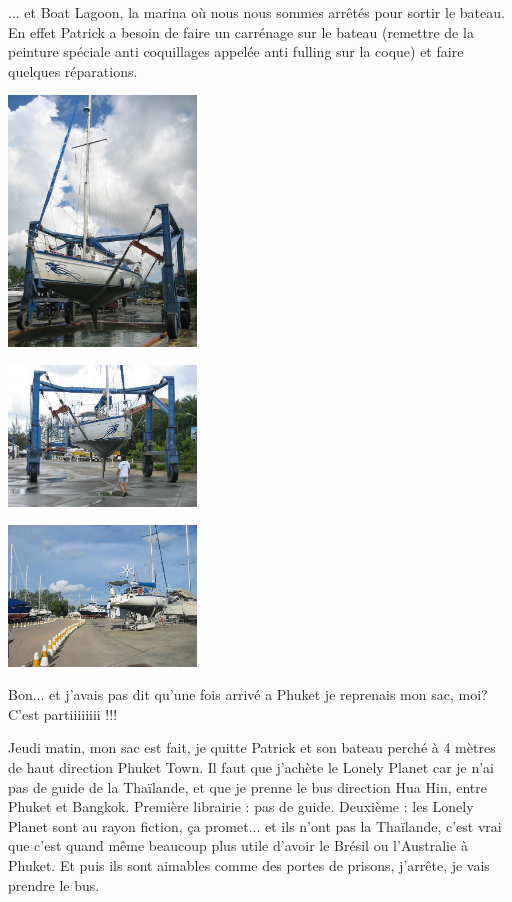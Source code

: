 \begin{multicols}{2}
... et Boat Lagoon, la marina où nous nous sommes arrêtés pour sortir le bateau. En effet Patrick a besoin de faire un carrénage sur le bateau (remettre de la peinture spéciale anti coquillages appelée anti fulling sur la coque) et faire quelques réparations.

\smallbreak
\hspace*{-0.65cm}
\includegraphics[width=5cm]{articles/Phucket/1212162371CgQw.jpg}
\smallbreak

\smallbreak
\hspace*{-0.65cm}
\includegraphics[width=5cm]{articles/Phucket/1212162371bVDs.jpg}
\smallbreak

\smallbreak
\hspace*{-0.65cm}
\includegraphics[width=5cm]{articles/Phucket/1212162369pBl0.jpg}
\smallbreak

Bon... et j'avais pas dit qu'une fois arrivé a Phuket je reprenais mon sac, moi? C'est partiiiiiiii !!!

Jeudi matin, mon sac est fait, je quitte Patrick et son bateau perché à 4 mètres de haut direction Phuket Town. Il faut que j'achète le Lonely Planet car je n'ai pas de guide de la Thaïlande, et que je prenne le bus direction Hua Hin, entre Phuket et Bangkok. Première librairie : pas de guide. Deuxième : les Lonely Planet sont au rayon fiction, ça promet... et ils n'ont pas la Thaïlande, c'est vrai que c'est quand même beaucoup plus utile d'avoir le Brésil ou l'Australie à Phuket. Et puis ils sont aimables comme des portes de prisons, j'arrête, je vais prendre le bus.


\end{multicols}

